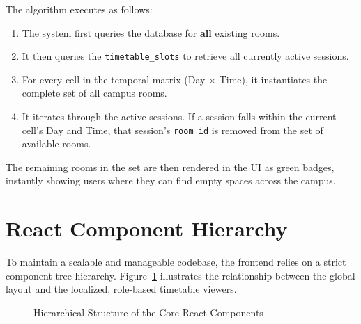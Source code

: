 The algorithm executes as follows:
\begin{enumerate}
    \item The system first queries the database for \textbf{all} existing rooms.
    \item It then queries the \texttt{timetable\_slots} to retrieve all currently active sessions.
    \item For every cell in the temporal matrix (Day $\times$ Time), it instantiates the complete set of all campus rooms.
    \item It iterates through the active sessions. If a session falls within the current cell's Day and Time, that session's \texttt{room\_id} is removed from the set of available rooms.
\end{enumerate}

The remaining rooms in the set are then rendered in the UI as green badges, instantly showing users where they can find empty spaces across the campus.

\section{React Component Hierarchy}

To maintain a scalable and manageable codebase, the frontend relies on a strict component tree hierarchy. Figure~\ref{fig:component_tree} illustrates the relationship between the global layout and the localized, role-based timetable viewers.

\begin{figure}[htbp]
\centering
{}
\caption{Hierarchical Structure of the Core React Components}
\label{fig:component_tree}
\end{figure}

